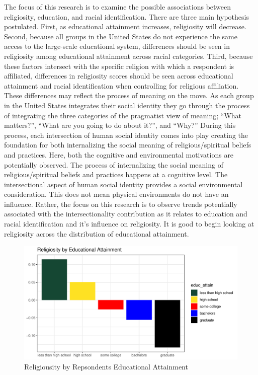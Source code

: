 \documentclass[
  12pt,
  letterpaper,
]{article}
\begin{document}
The focus of this research is to examine the possible associations
between religiosity, education, and racial identification. There are
three main hypothesis postulated. First, as educational attainment
increases, religiosity will decrease. Second, because all groups in the
United States do not experience the same access to the large-scale
educational system, differences should be seen in religiosity among
educational attainment across racial categories. Third, because these
factors intersect with the specific religion with which a respondent is
affiliated, differences in religiosity scores should be seen across
educational attainment and racial identification when controlling for
religious affiliation. These differences may reflect the process of
meaning on the move. As each group in the United States integrates their
social identity they go through the process of integrating the three
categories of the pragmatist view of meaning; ``What matters?'', ``What
are you going to do about it?'', and ``Why?'' During this process, each
intersection of human social identity comes into play creating the
foundation for both internalizing the social meaning of
religious/spiritual beliefs and practices. Here, both the cognitive and
environmental motivations are potentially observed. The process of
internalizing the social meaning of religious/spiritual beliefs and
practices happens at a cognitive level. The intersectional aspect of
human social identity provides a social environmental consideration.
This does not mean physical environments do not have an influence.
Rather, the focus on this research is to observe trends potentially
associated with the intersectionality contribution as it relates to
education and racial identification and it's influence on religiosity.
It is good to begin looking at religiosity across the distribution of
educational attainment.

\begin{figure}[!t]

{\centering \includegraphics{main_manuscript_files/figure-pdf/unnamed-chunk-5-1.pdf}

}

\caption{Religiousity by Repsondents Educational Attainment}

\end{figure}
\end{document}
